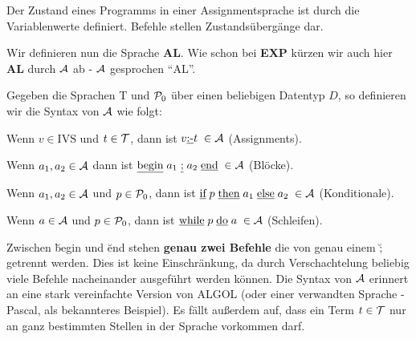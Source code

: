 Der Zustand eines Programms in einer Assignmentsprache ist durch die Variablenwerte definiert.
Befehle stellen Zustandsübergänge dar.

Wir definieren nun die Sprache \textbf{AL}.
Wie schon bei \textbf{EXP} kürzen wir auch hier \textbf{AL} durch $\mathcal{A}$ ab - $\mathcal{A}$ gesprochen ``AL''.
\begin{defn}
Gegeben die Sprachen $\text{T}$ und $\mathcal{P}_0$ über einen beliebigen Datentyp $D$,
so definieren wir die Syntax von $\mathcal{A}$ wie folgt:
\begin{\whichenum}
\item Wenn $v \in \text{IVS}$ und $t \in \mathcal{T}$,
dann ist $v \text{\underline{:-}} t \; \in \mathcal{A}$ (Assignments).
\item Wenn $a_1,a_2 \in \mathcal{A}$ dann ist $\text{\underline{begin}} \; a_1 \; \text{\underline{;}} \; a_2 \; \text{\underline{end}} \; \in \mathcal{A}$ (Blöcke).
\item Wenn $a_1,a_2 \in \mathcal{A}$ und $p \in \mathcal{P}_0$, dann ist $\text{\underline{if}} \; p \; \text{\underline{then}} \; a_1 \; \text{\underline{else}} \; a_2 \; \in \mathcal{A}$ (Konditionale).
\item Wenn $a \in \mathcal{A}$ und $p \in \mathcal{P}_0$, dann ist $\text{\underline{while}} \; p \; \text{\underline{do}} \; a \; \in \mathcal{A}$ (Schleifen).
\end{\whichenum}
\end{defn}

Zwischen \u{begin} und \u{end} stehen \textbf{genau zwei Befehle} die von genau einem \u{;} getrennt werden. Dies ist keine Einschränkung, da durch Verschachtelung beliebig viele Befehle nacheinander
ausgeführt werden können. Die Syntax von $\mathcal{A}$ erinnert an eine stark vereinfachte Version von ALGOL (oder einer verwandten Sprache - Pascal, als bekannteres Beispiel).
Es fällt außerdem auf, dass ein Term $t \in \mathcal{T}$ nur an ganz bestimmten Stellen in der Sprache vorkommen darf.

